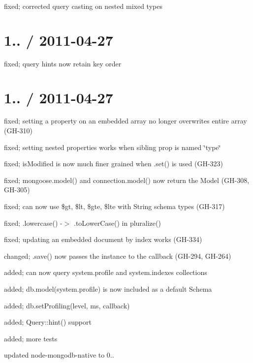 \begin{DoxyItemize}
\item fixed; corrected query casting on nested mixed types
\end{DoxyItemize}

\section*{1.. / 2011-\/04-\/27 }


\begin{DoxyItemize}
\item fixed; query hints now retain key order
\end{DoxyItemize}

\section*{1.. / 2011-\/04-\/27 }


\begin{DoxyItemize}
\item fixed; setting a property on an embedded array no longer overwrites entire array (G\+H-\/310)
\item fixed; setting nested properties works when sibling prop is named \char`\"{}type\char`\"{}
\item fixed; is\+Modified is now much finer grained when .set() is used (G\+H-\/323)
\item fixed; mongoose.\+model() and connection.\+model() now return the Model (G\+H-\/308, G\+H-\/305)
\item fixed; can now use \$gt, \$lt, \$gte, \$lte with String schema types (G\+H-\/317)
\item fixed; .lowercase() -\/$>$ .to\+Lower\+Case() in pluralize()
\item fixed; updating an embedded document by index works (G\+H-\/334)
\item changed; .save() now passes the instance to the callback (G\+H-\/294, G\+H-\/264)
\item added; can now query system.\+profile and system.\+indexes collections
\item added; db.\+model(\textquotesingle{}system.\+profile\textquotesingle{}) is now included as a default Schema
\item added; db.\+set\+Profiling(level, ms, callback)
\item added; Query\+::hint() support
\item added; more tests
\item updated node-\/mongodb-\/native to 0..
\end{DoxyItemize}

